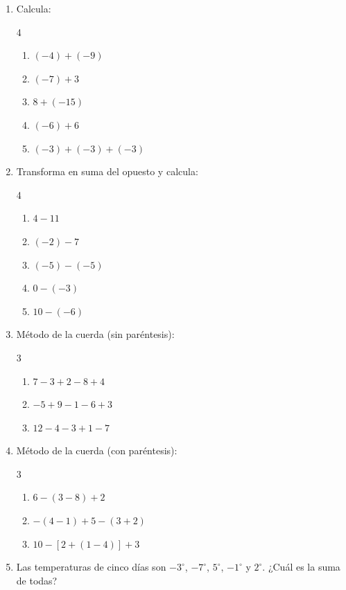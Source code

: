 \documentclass[11pt, letterpaper]{article}
\begin{document}
\begin{enumerate}[label=\textbf{\arabic*.}, leftmargin=*]
  \item Calcula:
  \begin{multicols}{4}
  \begin{enumerate}[label=\alph*)]
    \item $(-4)+(-9)$
    \item $(-7)+3$
    \item $8+(-15)$
    \item $(-6)+6$
    \item $(-3)+(-3)+(-3)$
  \end{enumerate}
  \end{multicols}

  \item Transforma en suma del opuesto y calcula:
  \begin{multicols}{4}
  \begin{enumerate}[label=\alph*)]
    \item $4-11$
    \item $(-2)-7$
    \item $(-5)-(-5)$
    \item $0-(-3)$
    \item $10-(-6)$
  \end{enumerate}
  \end{multicols}

  \item M\'etodo de la cuerda (sin par\'entesis):
  \begin{multicols}{3}
  \begin{enumerate}[label=\alph*)]
    \item $7-3+2-8+4$
    \item $-5+9-1-6+3$
    \item $12-4-3+1-7$
  \end{enumerate}
  \end{multicols}

  \item M\'etodo de la cuerda (con par\'entesis):
  \begin{multicols}{3}
  \begin{enumerate}[label=\alph*)]
    \item $6-(3-8)+2$
    \item $-(4-1)+5-(3+2)$
    \item $10-[2+(1-4)]+3$
  \end{enumerate}
  \end{multicols}

  \item Las temperaturas de cinco d\'ias son $-3^\circ$, $-7^\circ$, $5^\circ$, $-1^\circ$ y $2^\circ$. ¿Cu\'al es la suma de todas?
\end{enumerate}
\end{document}

